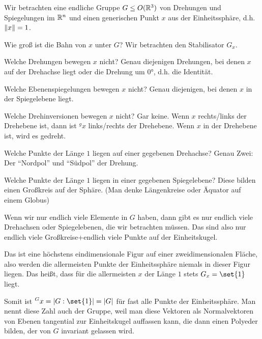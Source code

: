 \begin{example}
Wir betrachten eine endliche Gruppe $G\leq O(\mathbb{R}^3)$ von Drehungen und Spiegelungen im $\mathbb{R}^n$ und einen generischen Punkt $x$ aus der Einheitssphäre, d.h. $\lVert x\rVert=1$.

Wie groß ist die Bahn von $x$ unter $G$? Wir betrachten den Stabilisator $G_x$.

\medbreak
Welche Drehungen bewegen $x$ nicht? Genau diejenigen Drehungen, bei denen $x$ auf der Drehachse liegt oder die Drehung um $0°$, d.h. die Identität.

Welche Ebenenspiegelungen bewegen $x$ nicht? Genau diejenigen, bei denen $x$ in der Spiegelebene liegt.

Welche Drehinversionen bewegen $x$ nicht? Gar keine. Wenn $x$ rechts/links der Drehebene ist, dann ist ${^g x}$ links/rechts der Drehebene. Wenn $x$ in der Drehebene ist, wird es gedreht.

\medbreak
Welche Punkte der Länge $1$ liegen auf einer gegebenen Drehachse? Genau Zwei: Der \enquote{Nordpol} und \enquote{Südpol} der Drehung.

Welche Punkte der Länge $1$ liegen in einer gegebenen Spiegelebene? Diese bilden einen Großkreis auf der Sphäre. (Man denke Längenkreise oder Äquator auf einem Globus)

\medbreak
Wenn wir nur endlich viele Elemente in $G$ haben, dann gibt es nur endlich viele Drehachsen oder Spiegelebenen, die wir betrachten müssen. Das sind also nur endlich viele Großkreise+endlich viele Punkte auf der Einheitskugel.

Das ist eine höchstens eindimensionale Figur auf einer zweidimensionalen Fläche, also werden die allermeisten Punkte der Einheitssphäre niemals in dieser Figur liegen. Das heißt, dass für die allermeisten $x$ der Länge $1$ stets $G_x=\set{1}$ liegt.

Somit ist ${^G x} = \abs{G:\set{1}} = \abs{G}$ für fast alle Punkte der Einheitssphäre. Man nennt diese Zahl auch  der Gruppe, weil man diese Vektoren als Normalvektoren von Ebenen tangential zur Einheitskugel auffassen kann, die dann einen Polyeder bilden, der von $G$ invariant gelassen wird.
\end{example}

